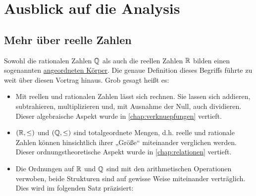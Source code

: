 



\chapter{Ausblick auf die Analysis} \label{chap:analysis}


\section{Mehr über reelle Zahlen}


\begin{bem}
    Sowohl die rationalen Zahlen $\mathbb Q$ als auch die reellen Zahlen $\mathbb R$ bilden einen sogenannten \href{https://en.wikipedia.org/wiki/Ordered_field}{angeordneten Körper}. Die genaue Definition dieses Begriffs führte zu weit über diesen Vortrag hinaus. Grob gesagt heißt es:
    \begin{itemize}
        \item Mit reellen und rationalen Zahlen lässt sich rechnen. Sie lassen sich addieren, subtrahieren, multiplizieren und, mit Ausnahme der Null, auch dividieren. Dieser algebraische Aspekt wurde in \cref{chap:verknuepfungen} vertieft.
        \item $(\mathbb R,\le)$ und $(\mathbb Q,\le)$ sind totalgeordnete Mengen, d.h. reelle und rationale Zahlen können hinsichtlich ihrer „Größe“ miteinander verglichen werden. Dieser ordnungstheoretische Aspekt wurde in \cref{chap:relationen} vertieft.
        \item Die Ordnungen auf $\mathbb R$ und $\mathbb Q$ sind mit den arithmetischen Operationen verwoben, beide Strukturen sind auf gewisse Weise miteinander verträglich. Dies wird im folgenden Satz präzisiert:
    \end{itemize}
\end{bem}


